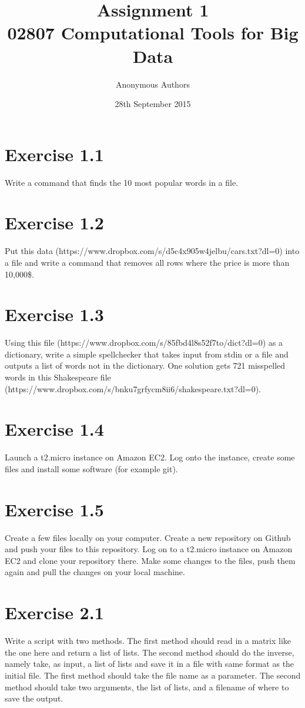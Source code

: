 \documentclass{article}
\title{Assignment 1\\02807 Computational Tools for Big Data}
\author{Anonymous Authors}
\date{28th September 2015}
\begin{document}
\maketitle

\section{Exercise 1.1}
Write a command that finds the 10 most popular words in a file.


\section{Exercise 1.2}
Put this data (https://www.dropbox.com/s/d5c4x905w4jelbu/cars.txt?dl=0) into a file and write a command that removes all rows where the price is more than 10,000\$.


\section{Exercise 1.3}
Using this file (https://www.dropbox.com/s/85fbd4l8s52f7to/dict?dl=0) as a dictionary, write a simple spellchecker that takes input from stdin or a file and outputs a list of words not in the dictionary. One solution gets 721 misspelled words in this Shakespeare file (https://www.dropbox.com/s/bnku7grfycm8ii6/shakespeare.txt?dl=0).



\section{Exercise 1.4}
Launch a t2.micro instance on Amazon EC2. Log onto the instance, create some files and install some software (for example git).
\section{Exercise 1.5}
Create a few files locally on your computer. Create a new repository on Github and push your files to this repository. Log on to a t2.micro instance on Amazon EC2 and clone your repository there. Make some changes to the files, push them again and pull the changes on your local machine.

\section{Exercise 2.1}
Write a script with two methods. The first method should read in a matrix like the one here and return a list of lists. The second method should do the inverse, namely take, as input, a list of lists and save it in a file with same format as the initial file. The first method should take the file name as a parameter. The second method should take two arguments, the list of lists, and a filename of where to save the output.

\end{document}
